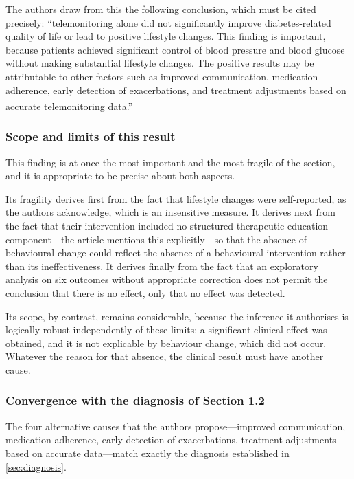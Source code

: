 \documentclass[12pt,a4paper,oneside]{report}
\newcommand{\bq}[1]{``#1''\textsuperscript{\dag}}
\begin{document}
The authors draw from this the following conclusion, which must be cited precisely: \bq{telemonitoring alone did not significantly improve diabetes-related quality of life or lead to positive lifestyle changes. This finding is important, because patients achieved significant control of blood pressure and blood glucose without making substantial lifestyle changes. The positive results may be attributable to other factors such as improved communication, medication adherence, early detection of exacerbations, and treatment adjustments based on accurate telemonitoring data.}

\subsubsection{Scope and limits of this result}

This finding is at once the most important and the most fragile of the section, and it is appropriate to be precise about both aspects.

Its fragility derives first from the fact that lifestyle changes were self-reported, as the authors acknowledge, which is an insensitive measure. It derives next from the fact that their intervention included no structured therapeutic education component---the article mentions this explicitly---so that the absence of behavioural change could reflect the absence of a behavioural intervention rather than its ineffectiveness. It derives finally from the fact that an exploratory analysis on six outcomes without appropriate correction does not permit the conclusion that there is no effect, only that no effect was detected.

Its scope, by contrast, remains considerable, because the inference it authorises is logically robust independently of these limits: a significant clinical effect was obtained, and it is not explicable by behaviour change, which did not occur. Whatever the reason for that absence, the clinical result must have another cause.

\subsubsection{Convergence with the diagnosis of Section 1.2}

The four alternative causes that the authors propose---improved communication, medication adherence, early detection of exacerbations, treatment adjustments based on accurate data---match exactly the diagnosis established in \cref{sec:diagnosis}.
\end{document}
